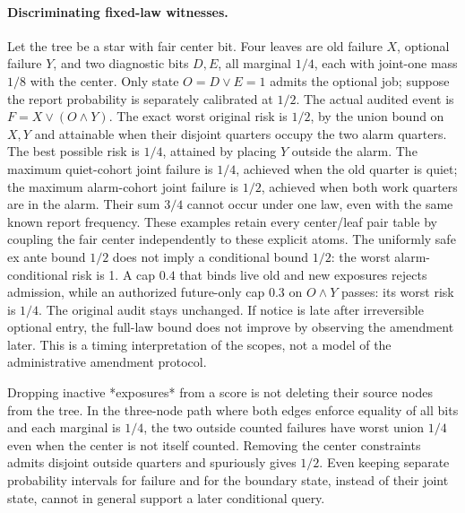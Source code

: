 \documentclass[11pt]{article}
\begin{document}
\paragraph{Discriminating fixed-law witnesses.}
Let the tree be a star with fair center bit. Four leaves are
old failure \(X\), optional failure \(Y\), and two diagnostic
bits \(D,E\), all marginal \(1/4\), each with joint-one mass
\(1/8\) with the center. Only state \(O=D\vee E=1\) admits
the optional job; suppose the report probability is separately
calibrated at \(1/2\). The actual audited event is
\(F=X\vee (O\wedge Y)\). The exact worst original risk is
\(1/2\), by the union bound on \(X,Y\) and attainable when
their disjoint quarters occupy the two alarm quarters.
The best possible risk is \(1/4\), attained by placing
\(Y\) outside the alarm. The maximum quiet-cohort joint
failure is \(1/4\), achieved when the old quarter is quiet;
the maximum alarm-cohort joint failure is \(1/2\),
achieved when both work quarters are in the alarm.
Their sum \(3/4\) cannot occur under one law, even with the
same known report frequency. These examples retain every
center/leaf pair table by coupling the fair center independently
to these explicit atoms. The uniformly safe ex ante bound
\(1/2\) does not imply a conditional bound \(1/2\):
the worst alarm-conditional risk is 1. A cap \(0.4\) that
binds live old and new exposures rejects admission, while an
authorized future-only cap \(0.3\) on \(O\wedge Y\) passes:
its worst risk is \(1/4\). The original audit stays unchanged.
If notice is late after irreversible optional entry, the
full-law bound does not improve by observing the amendment
later. This is a timing interpretation of the scopes, not
a model of the administrative amendment protocol.

Dropping inactive *exposures* from a score is not deleting
their source nodes from the tree. In the three-node path
where both edges enforce equality of all bits and each
marginal is \(1/4\), the two outside counted failures have
worst union \(1/4\) even when the center is not itself
counted. Removing the center constraints admits disjoint
outside quarters and spuriously gives \(1/2\).
Even keeping separate probability intervals for failure
and for the boundary state, instead of their joint state,
cannot in general support a later conditional query.
\end{document}
